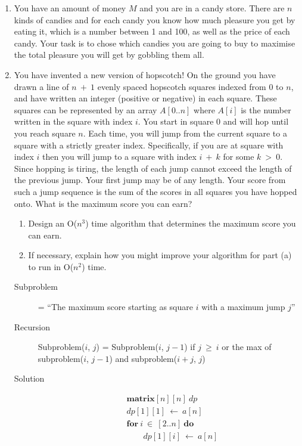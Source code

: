 \documentclass[a4paper]{article}
\begin{document}
\begin{enumerate}
				\item You have an amount of money $M$ and you are in a candy store. There are $n$ kinds of candies and for each candy you know how much pleasure you get by eating it, which is a number between 1 and 100, as well as the price of each candy. Your task is to chose which candies you are going to buy to maximise the total pleasure you will get by gobbling them all.

				\item You have invented a new version of hopscotch! On the ground you have drawn a line of $n\ +\ 1$ evenly spaced hopscotch squares indexed from $0$ to $n$, and have written an integer (positive or negative) in each square. These squares can be represented by an array $A[0..n]$ where $A[i]$ is the number written in the square with index $i$. You start in square $0$ and will hop until you reach square $n$. Each time, you will jump from the current square to a square with a strictly greater index. Specifically, if you are at square with index $i$ then you will jump to a square with index $i\ +\ k$ for some $k\ >\ 0$. Since hopping is tiring, the length of each jump cannot exceed the length of the previous jump. Your first jump may be of any length. Your score from such a jump sequence is the sum of the scores in all squares you have hopped onto. What is the maximum score you can earn?
						\begin{enumerate}
								\item Design an O($n^3$) time algorithm that determines the maximum score you can earn.
								\item If necessary, explain how you might improve your algorithm for part (a) to run in O($n^2$) time.
						\end{enumerate}
						\begin{description}
								\item[Subproblem] = ``The maximum score starting as square $i$ with a maximum jump $j$''
								\item[Recursion] Subproblem($i$, $j$) = Subproblem($i$, $j-1$) if $j\ \geq\ i$ or the max of subproblem($i$, $j-1$) and subproblem($i+j$, $j$)
								\item[Solution]
										\begin{align*}
												&\textbf{matrix}[n][n]\ \textit{dp}\\
												&\textit{dp}[1][1]\ \gets\ a[n]\\
												&\textbf{for}\ i\ \in\ [2..n]\ \textbf{do} \\
												&\qquad\textit{dp}[1][i]\ \gets\ a[n] \\

\end{align*}
\end{description}
\end{enumerate}
\end{document}
